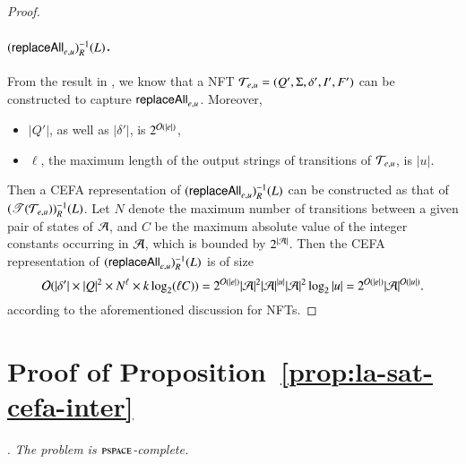 \begin{proof}
	\paragraph*{$(\mathsf{replaceAll}_{e,u})^{-1}_R(L)$.}
	From the result in \cite{CCH+18}, we know that  a NFT $\mathcal{T}_{e,u}=(Q', \Sigma, \delta', I', F')$ can be constructed to capture $\mathsf{replaceAll}_{e,u}$.  Moreover, 
	\begin{itemize}
		\item $|Q'|$, as well as $|\delta'|$, is $2^{\mathcal{O}(|e|)}$,
		\item $\ell$, the maximum length of the output strings of transitions of $\mathcal{T}_{e,u}$, is $|u|$.
	\end{itemize}
	Then a CEFA representation of $(\mathsf{replaceAll}_{e,u})^{-1}_R(L)$ can be constructed as that of $(\mathscr{T}(\mathcal{T}_{e,u}))^{-1}_R(L)$.
	Let $N$ denote the maximum number of transitions between a given pair of states of $\mathcal{A}$, and $C$ be the maximum absolute value of the integer constants occurring in $\mathcal{A}$, which is bounded by $2^{|\mathcal{A}|}$. Then the CEFA representation of $(\mathsf{replaceAll}_{e,u})^{-1}_R(L)$ is of size 
	\[
	\mathcal{O}(|\delta'| \times |Q|^2 \times N^\ell \times k \log_2 (\ell C)) = 2^{\mathcal{O}(|e|)} |\mathcal{A}|^2 |\mathcal{A}|^{|u|} |\mathcal{A}|^2 \log_2 |u|=2^{\mathcal{O}(|e|)} |\mathcal{A}|^{\mathcal{O}(|u|)}.
	\]
	according to the aforementioned discussion for NFTs.
\end{proof}


\section{Proof of Proposition~\ref{prop:la-sat-cefa-inter}}\label{app:sat-cefa}

.
\emph{The {\lasat} problem is $\textsc{pspace}$-complete.}

